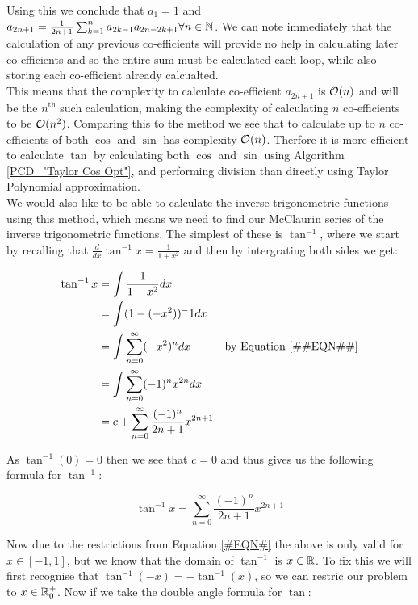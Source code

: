 {Using this we conclude that \(a_1 = 1\) and \(a_{2n+1} = \frac{1}{2n+1}\sum_{k=1}^n a_{2k-1}a_{2n-2k+1} \forall n \in \mathbb{N}\). We can note immediately that the calculation of any previous co-efficients will provide no help in calculating later co-efficients and so the entire sum must be calculated each loop, while also storing each co-efficient already calcualted.\\

This means that the complexity to calculate co-efficient \(a_{2n+1}\) is \(\mathcal{O}(n)\) and will be the \(n^\text{th}\) such calculation, making the complexity of calculating \(n\) co-efficients to be \(\mathcal{O}(n^2)\). Comparing this to the  method we see that to calculate up to \(n\) co-efficients of both \(\cos\) and \(\sin\) has complexity \(\mathcal{O}(n)\). Therfore it is more efficient to calculate \(\tan\) by calculating both \(\cos\) and \(\sin\) using Algorithm \ref{PCD_"Taylor Cos Opt"}, and performing division than directly using Taylor Polynomial approximation.\\

We would also like to be able to calculate the inverse trigonometric functions using this method, which means we need to find our McClaurin series of the inverse trigonometric functions. The simplest of these is \(\tan^{-1}\), where we start by recalling that \(\frac{d}{dx} \tan^{-1} x = \frac{1}{1+x^2}\) and then by intergrating both sides we get:

\begin{displaymath}
\begin{align*}
	\tan^{-1} x &= \int \frac{1}{1+x^2} dx\\
		&= \int (1 - (-x^2))^-1 dx\\
		&= \int \sum_{n=0}^\infty (-x^2)^n dx &\textrm{by Equation \ref{#EQN#}}\\
		&= \int \sum_{n=0}^\infty (-1)^nx^{2n} dx\\
		&= c + \sum_{n=0}^\infty \frac{(-1)^n}{2n+1}x^{2n+1}
\end{align*}
\end{displaymath}

As \(\tan^{-1} (0) = 0\) then we see that \(c = 0\) and thus gives us the following formula for \(\tan^{-1}\):

\[\tan^{-1} x = \sum_{n=0}^\infty \frac{(-1)^n}{2n+1}x^{2n+1}\]

Now due to the restrictions from Equation \ref{#EQN#} the above is only valid for \(x \in [-1, 1]\), but we know that the domain of \(\tan^{-1}\) is \(x \in \mathbb{R}\). To fix this we will first recognise that \(\tan^{-1}(-x) = -\tan^{-1}(x)\), so we can restric our problem to \(x \in \mathbb{R}^+_0\). Now if we take the double angle formula for \(\tan\):

}
